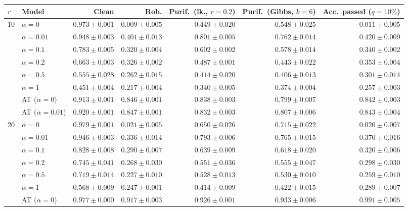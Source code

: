\begin{tabular}{@{}llrrrrr@{}}
\toprule
$r$ & Model & Clean & Rob. & Purif.\ (lk., $r{=}0.2$) & Purif.\ (Gibbs, $k{=}6$) & Acc.\ passed ($q{=}10\%$) \\
\midrule
\multirow{8}{*}{10} & $\alpha{=}0$ & $0.973 \pm 0.001$ & $0.009 \pm 0.005$ & $0.449 \pm 0.020$ & $0.548 \pm 0.025$ & $0.011 \pm 0.005$ \\
 & $\alpha{=}0.01$ & $0.948 \pm 0.003$ & $0.401 \pm 0.013$ & $0.801 \pm 0.005$ & $0.762 \pm 0.014$ & $0.420 \pm 0.009$ \\
 & $\alpha{=}0.1$ & $0.783 \pm 0.005$ & $0.320 \pm 0.004$ & $0.602 \pm 0.002$ & $0.578 \pm 0.014$ & $0.340 \pm 0.002$ \\
 & $\alpha{=}0.2$ & $0.663 \pm 0.003$ & $0.326 \pm 0.002$ & $0.487 \pm 0.001$ & $0.443 \pm 0.022$ & $0.353 \pm 0.004$ \\
 & $\alpha{=}0.5$ & $0.555 \pm 0.028$ & $0.262 \pm 0.015$ & $0.414 \pm 0.020$ & $0.406 \pm 0.013$ & $0.301 \pm 0.014$ \\
 & $\alpha{=}1$ & $0.451 \pm 0.004$ & $0.217 \pm 0.004$ & $0.340 \pm 0.005$ & $0.374 \pm 0.004$ & $0.257 \pm 0.003$ \\
 & AT ($\alpha{=}0$) & $0.913 \pm 0.001$ & $0.846 \pm 0.001$ & $0.838 \pm 0.003$ & $0.799 \pm 0.007$ & $0.842 \pm 0.003$ \\
 & AT ($\alpha{=}0.01$) & $0.920 \pm 0.001$ & $0.847 \pm 0.001$ & $0.832 \pm 0.003$ & $0.807 \pm 0.006$ & $0.843 \pm 0.004$ \\
\cmidrule(lr){1-7}
\multirow{8}{*}{20} & $\alpha{=}0$ & $0.979 \pm 0.001$ & $0.021 \pm 0.005$ & $0.650 \pm 0.026$ & $0.715 \pm 0.022$ & $0.020 \pm 0.007$ \\
 & $\alpha{=}0.01$ & $0.946 \pm 0.003$ & $0.336 \pm 0.014$ & $0.793 \pm 0.006$ & $0.765 \pm 0.015$ & $0.370 \pm 0.016$ \\
 & $\alpha{=}0.1$ & $0.828 \pm 0.008$ & $0.290 \pm 0.007$ & $0.639 \pm 0.009$ & $0.618 \pm 0.020$ & $0.320 \pm 0.006$ \\
 & $\alpha{=}0.2$ & $0.745 \pm 0.041$ & $0.268 \pm 0.030$ & $0.551 \pm 0.036$ & $0.555 \pm 0.047$ & $0.298 \pm 0.030$ \\
 & $\alpha{=}0.5$ & $0.719 \pm 0.014$ & $0.227 \pm 0.010$ & $0.528 \pm 0.013$ & $0.530 \pm 0.010$ & $0.259 \pm 0.010$ \\
 & $\alpha{=}1$ & $0.568 \pm 0.009$ & $0.247 \pm 0.001$ & $0.414 \pm 0.009$ & $0.422 \pm 0.015$ & $0.289 \pm 0.007$ \\
 & AT ($\alpha{=}0$) & $0.977 \pm 0.000$ & $\mathbf{0.917 \pm 0.003}$ & $\mathbf{0.926 \pm 0.001}$ & $\mathbf{0.933 \pm 0.006}$ & $\mathbf{0.991 \pm 0.005}$ \\

\end{tabular}
